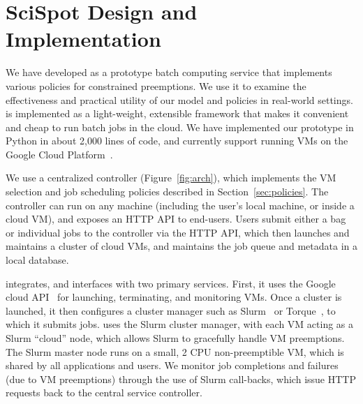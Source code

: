 \section{SciSpot Design and Implementation}
\label{sec:impl}

We have developed \sysname as a prototype batch computing service that implements various policies for constrained preemptions. 
We use it to examine the effectiveness and practical utility of our model and policies in real-world settings. 
%
\sysname is implemented as a light-weight, extensible framework that makes it convenient and cheap to run batch jobs in the cloud. 
We have implemented our prototype in Python in about 2,000 lines of code, and currently support running VMs on the Google Cloud Platform~\cite{gcp}. 
%


We use a centralized controller (Figure~\ref{fig:arch}), which implements the VM selection and job scheduling policies described in Section~\ref{sec:policies}. 
The controller can run on any machine (including the user's local machine, or inside a cloud VM), and exposes an HTTP API to end-users. 
Users submit either a bag or individual jobs to the controller via the HTTP API, which then launches and maintains a cluster of cloud VMs, and maintains the job queue and metadata in a local database. 

\sysname integrates, and interfaces with two primary services.
First, it uses the Google cloud API~\cite{gcloud-api} for launching, terminating, and monitoring VMs.
Once a cluster is launched, it then configures a cluster manager such as Slurm~\cite{slurm} or Torque~\cite{torque}, to which it submits jobs. 
\sysname uses the Slurm cluster manager, with each VM acting as a Slurm ``cloud'' node, which allows Slurm to gracefully handle VM preemptions.
The Slurm master node runs on a small, 2 CPU non-preemptible VM, which is shared by all applications and users. 
We monitor job completions and failures (due to VM preemptions) through the use of Slurm call-backs, which issue HTTP requests back to the central service controller. 

